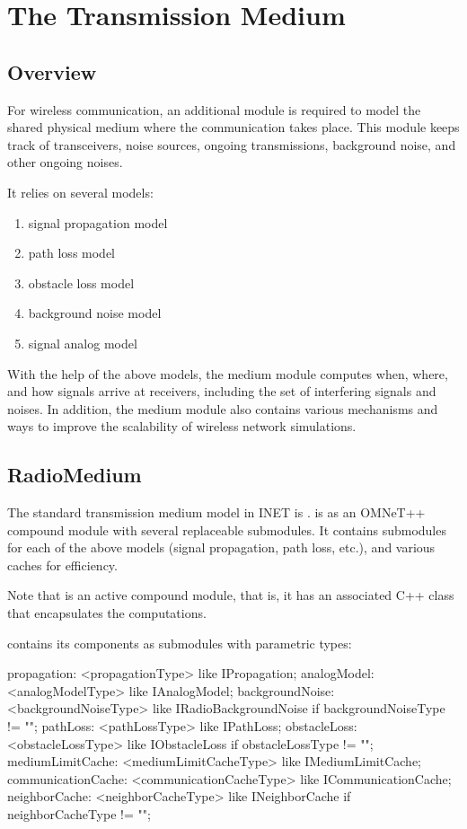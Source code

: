 \chapter{The Transmission Medium}
\label{cha:transmission-medium}

\section{Overview}

For wireless communication, an additional module is required to model the
shared physical medium where the communication takes place. This module
keeps track of transceivers, noise sources, ongoing transmissions,
background noise, and other ongoing noises.

It relies on several models:
 
\begin{enumerate}
  \item signal propagation model
  \item path loss model
  \item obstacle loss model
  \item background noise model
  \item signal analog model
\end{enumerate}

With the help of the above models, the medium module computes 
when, where, and how signals arrive at receivers, including 
the set of interfering signals and noises. In addition, 
the medium module also contains various mechanisms and ways 
to improve the scalability of wireless network simulations.

\section{RadioMedium}

The standard transmission medium model in INET is . 
 is as an OMNeT++ compound module with
several replaceable submodules. It contains submodules for 
each of the above models (signal propagation, path loss, etc.), 
and various caches for efficiency. 

Note that  is an active compound module, that is, 
it has an associated C++ class that encapsulates the computations.

 contains its components as submodules 
with parametric types:

\begin{ned}
propagation: <propagationType> like IPropagation;
analogModel: <analogModelType> like IAnalogModel;
backgroundNoise: <backgroundNoiseType> like IRadioBackgroundNoise 
    if backgroundNoiseType != "";
pathLoss: <pathLossType> like IPathLoss;
obstacleLoss: <obstacleLossType> like IObstacleLoss 
    if obstacleLossType != "";
mediumLimitCache: <mediumLimitCacheType> like IMediumLimitCache;
communicationCache: <communicationCacheType> like ICommunicationCache;
neighborCache: <neighborCacheType> like INeighborCache 
    if neighborCacheType != "";
\end{ned}

